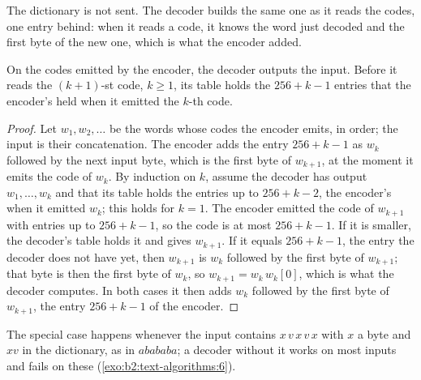The dictionary is not sent. The decoder builds the same one as it reads the codes, one entry behind: when it reads a
code, it knows the word just decoded and the first byte of the new one, which is what the encoder added.

\label{lst:b2:text-algorithms:lzw}

\label{out:b2:text-algorithms:lzw}

\begin{theorem}\label{thm:b2:text-algorithms:lzw}
On the codes emitted by the encoder, the decoder outputs the input. Before it reads the $(k+1)$-st code, $k \geq 1$, its
table holds the $256 + k - 1$ entries that the encoder's held when it emitted the $k$-th code.
\end{theorem}

\begin{proof}
Let $w_1, w_2, \dots$ be the words whose codes the encoder emits, in order; the input is their concatenation. The encoder
adds the entry $256 + k - 1$ as $w_k$ followed by the next input byte, which is the first byte of $w_{k+1}$, at the
moment it emits the code of $w_k$. By induction on $k$, assume the decoder has output $w_1, \dots, w_k$ and that its
table holds the entries up to $256 + k - 2$, the encoder's when it emitted $w_k$; this holds for $k = 1$. The encoder
emitted the code of $w_{k+1}$ with entries up to $256 + k - 1$, so the code is at most $256 + k - 1$. If it is smaller,
the decoder's table holds it and gives $w_{k+1}$. If it equals $256 + k - 1$, the entry the decoder does not have yet,
then $w_{k+1}$ is $w_k$ followed by the first byte of $w_{k+1}$; that byte is then the first byte of $w_k$, so $w_{k+1}
= w_k\, w_k[0]$, which is what the decoder computes. In both cases it then adds $w_k$ followed by the first byte of
$w_{k+1}$, the entry $256 + k - 1$ of the encoder.
\end{proof}

The special case happens whenever the input contains $x\,v\,x\,v\,x$ with $x$ a byte and $xv$ in the dictionary, as in
$abababa$; a decoder without it works on most inputs and fails on these (\cref{exo:b2:text-algorithms:6}).

